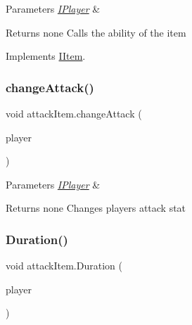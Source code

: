 \begin{DoxyParams}{Parameters}
{\em \mbox{\hyperlink{class_i_player}{I\+Player}}} & \\
\hline
\end{DoxyParams}
\begin{DoxyReturn}{Returns}
none Calls the ability of the item 
\end{DoxyReturn}


Implements \mbox{\hyperlink{interface_i_item_afe73efbf8316273df20162d6f4b20648}{I\+Item}}.

\mbox{\label{classattack_item_ac4ed86e9328a04f08568bd9374685a15}} 
\subsubsection{\texorpdfstring{change\+Attack()}{changeAttack()}}
{\footnotesize\ttfamily void attack\+Item.\+change\+Attack (\begin{DoxyParamCaption}\item[{\mbox{\hyperlink{class_i_player}{I\+Player}}}]{player }\end{DoxyParamCaption})\hspace{0.3cm}{\ttfamily [inline]}}


\begin{DoxyParams}{Parameters}
{\em \mbox{\hyperlink{class_i_player}{I\+Player}}} & \\
\hline
\end{DoxyParams}
\begin{DoxyReturn}{Returns}
none Changes player\textquotesingle{}s attack stat 
\end{DoxyReturn}
\mbox{\label{classattack_item_a5cf5ac415471d294a3244988466d54ac}} 
\subsubsection{\texorpdfstring{Duration()}{Duration()}}
{\footnotesize\ttfamily void attack\+Item.\+Duration (\begin{DoxyParamCaption}\item[{\mbox{\hyperlink{class_i_player}{I\+Player}}}]{player }\end{DoxyParamCaption})\hspace{0.3cm}{\ttfamily [inline]}}


